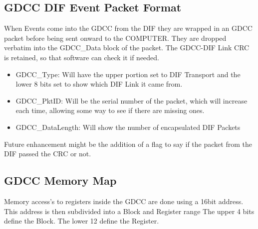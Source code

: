 \subsection{GDCC DIF Event Packet Format}

When Events come into the GDCC from the DIF they are wrapped in an
GDCC packet before being sent onward to the COMPUTER. They are dropped
verbatim into the GDCC\_Data block of the packet. The GDCC-DIF Link
CRC is retained, so that software can check it if needed.

\begin{itemize}
\item GDCC\_Type: Will have the upper portion set to DIF Transport and
  the lower 8 bits set to show which DIF Link it came from.
\item GDCC\_PktID: Will be the serial number of the packet, which will
  increase each time, allowing some way to see if there are missing
  ones.
\item GDCC\_DataLength: Will show the number of encapsulated DIF
  Packets
\end{itemize} Future enhancement might be the addition of a flag to
say if the packet from the DIF passed the CRC or not.

\subsection{GDCC Memory Map}
Memory access's to registers inside the GDCC are done using a 16bit
address. This address is then subdivided into a Block and Register
range The upper 4 bits define the Block. The lower 12 define the
Register.

